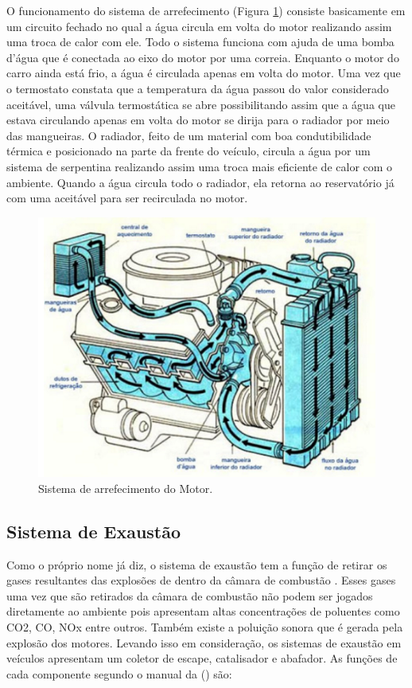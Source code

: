 	O funcionamento do sistema de arrefecimento (Figura \ref{fig:sistemaarrefecimento}) consiste basicamente em um circuito fechado no qual a água circula em volta do motor realizando assim uma troca de calor com ele. Todo o sistema funciona com ajuda de uma bomba d’água que é conectada ao eixo do motor por uma correia. Enquanto o motor do carro ainda está frio, a água é circulada apenas em volta do motor. Uma vez que o termostato constata que a temperatura da água passou do valor considerado aceitável, uma válvula termostática se abre possibilitando assim que a água que estava circulando apenas em volta do motor se dirija para o radiador por meio das mangueiras. O radiador, feito de um material com boa condutibilidade térmica e posicionado na parte da frente do veículo, circula a água por um sistema de serpentina realizando assim uma troca mais eficiente de calor com o ambiente. Quando a água circula todo o radiador, ela retorna ao reservatório já com uma aceitável para ser recirculada no motor.
	
\begin{figure}[h!]
	\centering
	\includegraphics[keepaspectratio=true,scale= 0.7]{figuras/sistemaarrefecimento.png}
	\caption{Sistema de arrefecimento do Motor.}
	\label{fig:sistemaarrefecimento}
\end{figure}

\subsection{Sistema de Exaustão}

	Como o próprio nome já diz, o sistema de exaustão tem a função de retirar os gases resultantes das explosões de dentro da câmara de combustão \cite{heyood1988}. Esses gases uma vez que são retirados da câmara de combustão não podem ser jogados diretamente ao ambiente pois apresentam altas concentrações de poluentes como CO2, CO, NOx entre outros. Também existe a poluição sonora que é gerada pela explosão dos motores. Levando isso em consideração, os sistemas de exaustão em veículos apresentam um coletor de escape, catalisador e abafador. As funções de cada componente segundo o manual da \citeauthor{bosch2004} (\citeyear{bosch2004}) são:
	
